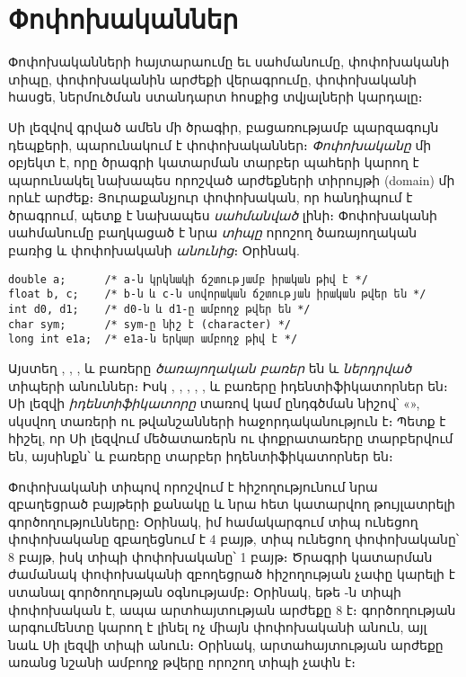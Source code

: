 \chapter{Փոփոխականներ}
\label{cha:variables}

\begin{epigraph}
Փոփոխականների հայտարաումը եւ սահմանումը, փոփոխականի
տիպը, փոփոխականին արժեքի վերագրումը, փոփոխականի հասցե,
ներմուծման ստանդարտ հոսքից տվյալների կարդալը։
\end{epigraph}

Սի լեզվով գրված ամեն մի ծրագիր, բացառությամբ պարզագույն դեպքերի,
պարունակում է փոփոխականներ։ \emph{Փոփոխականը}
մի օբյեկտ է, որը ծրագրի կատարման տարբեր պահերի կարող է պարունակել
նախապես որոշված ար\-ժեքների տիրույթի (domain) մի որևէ արժեք։
Յուրաքանչյուր փոփոխական, որ հանդիպում է ծրագրում, պետք է նախապես
\emph{սահմանված} լինի։ Փոփոխականի
սահմանումը բաղկացած է նրա \emph{տիպը} որոշող
ծառայողական բառից և փոփո\-խականի \emph{անունից}։
Օրինակ.

\begin{Verbatim}
double a;      /* a-ն կրկնակի ճշտությամբ իրական թիվ է */
float b, c;    /* b-ն և c-ն սովորական ճշտության իրական թվեր են */
int d0, d1;    /* d0-ն և d1-ը ամբողջ թվեր են */
char sym;      /* sym-ը նիշ է (character) */
long int e1a;  /* e1a-ն երկար ամբողջ թիվ է */
\end{Verbatim}

Այստեղ , , ,  և
 բառերը \emph{ծառայողական բառեր} են և \emph{ներդրված}
տիպերի անուններ։ Իսկ , , , ,
,  և  բառերը իդենտիֆիկատորներ են։
Սի լեզվի \emph{իդենտիֆիկատորը} տառով կամ ընդգծման նիշով՝
«\code{\_}», սկսվող տառերի ու թվանշանների հաջորդականություն է։
Պետք է հիշել, որ Սի լեզվում մեծատառերն ու փոքրատառերը տարբերվում
են, այսինքն՝  և  բառերը տարբեր
իդենտիֆիկատորներ են։

Փոփոխականի տիպով որոշվում է հիշողությունում նրա զբաղեցրած բայթերի
քանակը և նրա հետ կատարվող թույլատրելի գործողությունները։ Օրինակ, իմ
համակարգում  տիպ ունեցող փոփոխականը զբաղեցնում է 4 բայթ,
 տիպ ունեցող փոփոխականը՝ 8 բայթ, իսկ  տիպի
փոփոխականը՝ 1 բայթ։ Ծրագրի կատարման ժամանակ փոփոխականի զբողեցրած
հիշողության չափը կարելի է ստանալ  գործողության օգնությամբ։
Օրինակ, եթե -ն  տիպի փոփոխական է, ապա
 արտհայտության արժեքը 8 է։ 
գործողության արգումենտը կարող է լինել ոչ միայն փոփոխականի անուն,
այլ նաև Սի լեզվի տիպի անուն։ Օրինակ, 
արտահայտութ\-յան արժեքը առանց նշանի ամբողջ թվերը որոշող տիպի չափն է։

